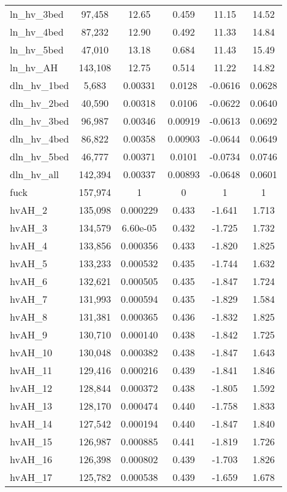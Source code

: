 \begin{tabular}{lccccc}
ln\_hv\_3bed & 97,458 & 12.65 & 0.459 & 11.15 & 14.52 \\
ln\_hv\_4bed & 87,232 & 12.90 & 0.492 & 11.33 & 14.84 \\
ln\_hv\_5bed & 47,010 & 13.18 & 0.684 & 11.43 & 15.49 \\
ln\_hv\_AH & 143,108 & 12.75 & 0.514 & 11.22 & 14.82 \\
dln\_hv\_1bed & 5,683 & 0.00331 & 0.0128 & -0.0616 & 0.0628 \\
dln\_hv\_2bed & 40,590 & 0.00318 & 0.0106 & -0.0622 & 0.0640 \\
dln\_hv\_3bed & 96,987 & 0.00346 & 0.00919 & -0.0613 & 0.0692 \\
dln\_hv\_4bed & 86,822 & 0.00358 & 0.00903 & -0.0644 & 0.0649 \\
dln\_hv\_5bed & 46,777 & 0.00371 & 0.0101 & -0.0734 & 0.0746 \\
dln\_hv\_all & 142,394 & 0.00337 & 0.00893 & -0.0648 & 0.0601 \\
fuck & 157,974 & 1 & 0 & 1 & 1 \\
hvAH\_2 & 135,098 & 0.000229 & 0.433 & -1.641 & 1.713 \\
hvAH\_3 & 134,579 & 6.60e-05 & 0.432 & -1.725 & 1.732 \\
hvAH\_4 & 133,856 & 0.000356 & 0.433 & -1.820 & 1.825 \\
hvAH\_5 & 133,233 & 0.000532 & 0.435 & -1.744 & 1.632 \\
hvAH\_6 & 132,621 & 0.000505 & 0.435 & -1.847 & 1.724 \\
hvAH\_7 & 131,993 & 0.000594 & 0.435 & -1.829 & 1.584 \\
hvAH\_8 & 131,381 & 0.000365 & 0.436 & -1.832 & 1.825 \\
hvAH\_9 & 130,710 & 0.000140 & 0.438 & -1.842 & 1.725 \\
hvAH\_10 & 130,048 & 0.000382 & 0.438 & -1.847 & 1.643 \\
hvAH\_11 & 129,416 & 0.000216 & 0.439 & -1.841 & 1.846 \\
hvAH\_12 & 128,844 & 0.000372 & 0.438 & -1.805 & 1.592 \\
hvAH\_13 & 128,170 & 0.000474 & 0.440 & -1.758 & 1.833 \\
hvAH\_14 & 127,542 & 0.000194 & 0.440 & -1.847 & 1.840 \\
hvAH\_15 & 126,987 & 0.000885 & 0.441 & -1.819 & 1.726 \\
hvAH\_16 & 126,398 & 0.000802 & 0.439 & -1.703 & 1.826 \\
hvAH\_17 & 125,782 & 0.000538 & 0.439 & -1.659 & 1.678 \\

\end{tabular}

